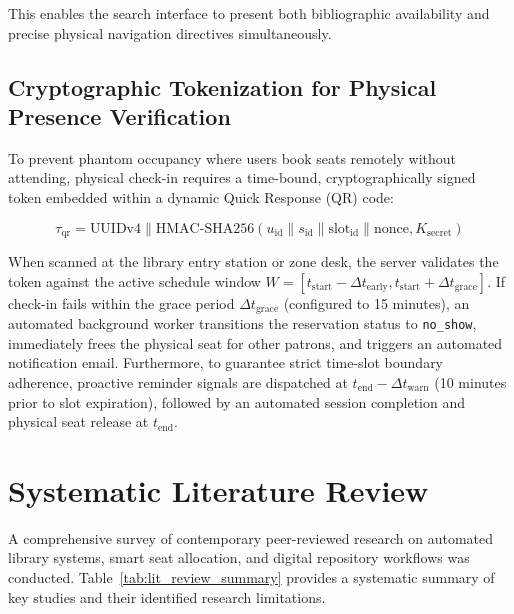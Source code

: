 This enables the search interface to present both bibliographic availability and precise physical navigation directives simultaneously.

\subsection{Cryptographic Tokenization for Physical Presence Verification}
To prevent phantom occupancy where users book seats remotely without attending, physical check-in requires a time-bound, cryptographically signed token embedded within a dynamic Quick Response (QR) code:

\begin{equation}
\tau_{\text{qr}} = \text{UUIDv4} \parallel \text{HMAC-SHA256}(u_{\text{id}} \parallel s_{\text{id}} \parallel \text{slot}_{\text{id}} \parallel \text{nonce}, K_{\text{secret}})
\end{equation}

When scanned at the library entry station or zone desk, the server validates the token against the active schedule window $W = [t_{\text{start}} - \Delta t_{\text{early}}, t_{\text{start}} + \Delta t_{\text{grace}}]$. If check-in fails within the grace period $\Delta t_{\text{grace}}$ (configured to 15 minutes), an automated background worker transitions the reservation status to \texttt{no\_show}, immediately frees the physical seat for other patrons, and triggers an automated notification email. Furthermore, to guarantee strict time-slot boundary adherence, proactive reminder signals are dispatched at $t_{\text{end}} - \Delta t_{\text{warn}}$ (10 minutes prior to slot expiration), followed by an automated session completion and physical seat release at $t_{\text{end}}$.

\section{Systematic Literature Review}
A comprehensive survey of contemporary peer-reviewed research on automated library systems, smart seat allocation, and digital repository workflows was conducted. Table~\ref{tab:lit_review_summary} provides a systematic summary of key studies and their identified research limitations.

